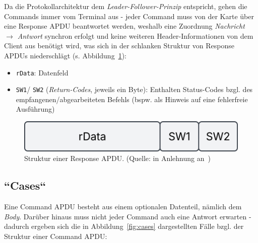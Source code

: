 Da die Protokollarchitektur dem \textit{Leader-Follower-Prinzip} entspricht, gehen die Commands immer vom Terminal aus - jeder Command muss von der Karte über eine Response APDU beantwortet werden, weshalb eine Zuordnung \textit{Nachricht $\rightarrow$ Antwort} synchron erfolgt und keine weiteren Header-Informationen von dem Client aus benötigt wird, was sich in der schlanken Struktur von Response APDUs niederschlägt (s. Abbildung~\ref{fig:rapdu}):

\begin{itemize}
    \itemsep0.5em
    \item \texttt{rData}: Datenfeld
    \item \texttt{SW1}/ \texttt{SW2} (\textit{Return-Codes}, jeweils ein Byte): Enthalten Status-Codes bzgl. des empfangenen/abgearbeiteten Befehls (bspw.  als Hinweis auf eine fehlerfreie Ausführung)
\end{itemize}

\begin{figure}
    \centering
    \includegraphics[scale=0.4]{aufgabe 1/img/rapdu.svg}
    \caption{Struktur einer Response APDU. (Quelle: in Anlehnung an~\cite[\textbf{Abb 2.6}, 24]{ITS5})}
    \label{fig:rapdu}
\end{figure}


\subsection*{``Cases``}

Eine Command APDU besteht aus einem optionalen Datenteil, nämlich dem \textit{Body}.
Darüber hinaus muss nicht jeder Command auch eine Antwort erwarten - dadurch ergeben sich die in Abbildung~\ref{fig:cases} dargestellten Fälle bzgl. der Struktur einer Command APDU:

